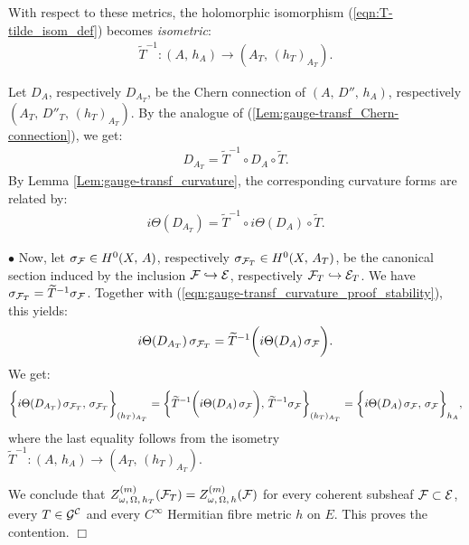 \documentclass[12pt]{article}
\begin{document}
With respect to these metrics, the holomorphic isomorphism (\ref{eqn:T-tilde_isom_def}) becomes {\it isometric}: \begin{eqnarray*}\widetilde{T}^{-1} : (A,\,h_A)\longrightarrow(A_T,\,(h_T)_{A_T}).\end{eqnarray*}

Let $D_A$, respectively $D_{A_T}$, be the Chern connection of $(A,\,D'',\,h_A)$, respectively $(A_T,\,D''_T,\,(h_T)_{A_T})$. By the analogue of (\ref{Lem:gauge-transf_Chern-connection}), we get: \begin{eqnarray*}D_{A_T} = \widetilde{T}^{-1}\circ D_A\circ\widetilde{T}.\end{eqnarray*} By Lemma \ref{Lem:gauge-transf_curvature}, the corresponding curvature forms are related by: \begin{eqnarray}\label{eqn:gauge-transf_curvature_proof_stability}i\Theta(D_{A_T}) = \widetilde{T}^{-1}\circ i\Theta(D_A)\circ\widetilde{T}.\end{eqnarray}

$\bullet$ Now, let $\sigma_{\cal F}\in H^0(X,\,A)$, respectively $\sigma_{{\cal F}_T}\in H^0(X,\,A_T)$, be the canonical section induced by the inclusion ${\cal F}\hookrightarrow{\cal E}$, respectively ${\cal F}_T\hookrightarrow{\cal E}_T$. We have $\sigma_{{\cal F}_T} = \widetilde{T}^{-1}\sigma_{\cal F}$. Together with (\ref{eqn:gauge-transf_curvature_proof_stability}), this yields: \begin{eqnarray*}i\Theta(D_{A_T})\,\sigma_{{\cal F}_T} = \widetilde{T}^{-1}\bigg(i\Theta(D_A)\,\sigma_{\cal F}\bigg).\end{eqnarray*} We get: \begin{eqnarray*}\bigg\{i\Theta(D_{A_T})\,\sigma_{{\cal F}_T},\,\sigma_{{\cal F}_T}\bigg\}_{(h_T)_{A_T}} = \bigg\{\widetilde{T}^{-1}\bigg(i\Theta(D_A)\,\sigma_{\cal F}\bigg),\,\widetilde{T}^{-1}\sigma_{\cal F}\bigg\}_{(h_T)_{A_T}} = \bigg\{i\Theta(D_A)\,\sigma_{\cal F},\,\sigma_{\cal F}\bigg\}_{h_A},\end{eqnarray*} where the last equality follows from the isometry $\widetilde{T}^{-1} : (A,\,h_A)\longrightarrow(A_T,\,(h_T)_{A_T})$.

We conclude that $Z_{\omega,\,\Omega,\,h_T}^{(m)}({\cal F}_T) = Z_{\omega,\,\Omega,\,h}^{(m)}({\cal F})$ for every coherent subsheaf ${\cal F}\subset{\cal E}$, every $T\in{\cal G}^{\cal C}$ and every $C^\infty$ Hermitian fibre metric $h$ on $E$. This proves the contention.  \hfill $\Box$

\vspace{2ex}
\end{document}
